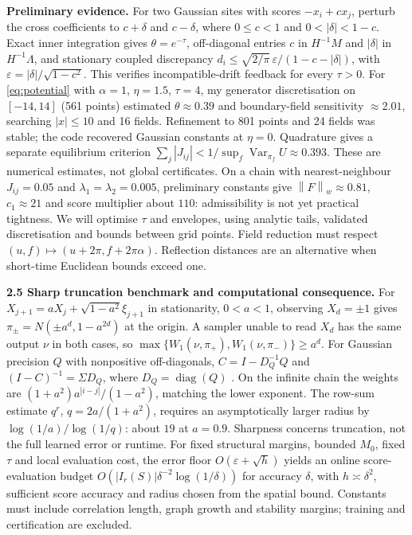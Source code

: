\documentclass[12pt,a4paper]{article}
\newcommand{\W}{W_1}
\newcommand{\normw}[1]{\left\|#1\right\|_w}
\begin{document}
\textbf{Preliminary evidence.} For two Gaussian sites with scores $-x_i+cx_j$, perturb the cross coefficients to $c+\delta$ and $c-\delta$, where $0\leq c<1$ and $0<|\delta|<1-c$. Exact inner integration gives $\theta=e^{-\tau}$, off-diagonal entries $c$ in $H^{-1}M$ and $|\delta|$ in $H^{-1}\Lambda$, and stationary coupled discrepancy $d_i\leq\sqrt{2/\pi}\,\varepsilon/(1-c-|\delta|)$, with $\varepsilon=|\delta|/\sqrt{1-c^2}$. This verifies incompatible-drift feedback for every $\tau>0$.
For \eqref{eq:potential} with $\alpha=1$, $\eta=1.5$, $\tau=4$, my generator discretisation on $[-14,14]$ (561 points) estimated $\theta\approx0.39$ and boundary-field sensitivity $\approx2.01$, searching $|x|\leq10$ and 16 fields. Refinement to 801 points and 24 fields was stable; the code recovered Gaussian constants at $\eta=0$. Quadrature gives a separate equilibrium criterion $\sum_j|J_{ij}|<1/\sup_f\operatorname{Var}_{\pi_f}U\approx0.393$. These are numerical estimates, not global certificates.
On a chain with nearest-neighbour $J_{ij}=0.05$ and $\lambda_1=\lambda_2=0.005$, preliminary constants give $\normw{F}\approx0.81$, $c_1\approx21$ and score multiplier about $110$: admissibility is not yet practical tightness. We will optimise $\tau$ and envelopes, using analytic tails, validated discretisation and bounds between grid points. Field reduction must respect $(u,f)\mapsto(u+2\pi,f+2\pi\alpha)$. Reflection distances are an alternative when short-time Euclidean bounds exceed one.

\textbf{2.5 Sharp truncation benchmark and computational consequence.}
For $X_{j+1}=aX_j+\sqrt{1-a^2}\xi_{j+1}$ in stationarity, $0<a<1$, observing $X_d=\pm1$ gives $\pi_\pm=N(\pm a^d,1-a^{2d})$ at the origin. A sampler unable to read $X_d$ has the same output $\nu$ in both cases, so $\max\{\W(\nu,\pi_+),\W(\nu,\pi_-)\}\geq a^d$. For Gaussian precision $Q$ with nonpositive off-diagonals, $C=I-D_Q^{-1}Q$ and $(I-C)^{-1}=\Sigma D_Q$, where $D_Q=\operatorname{diag}(Q)$ \cite{MJW06}. On the infinite chain the weights are $(1+a^2)a^{|i-j|}/(1-a^2)$, matching the lower exponent. The row-sum estimate $q^r$, $q=2a/(1+a^2)$, requires an asymptotically larger radius by $\log(1/a)/\log(1/q)$: about $19$ at $a=0.9$. Sharpness concerns truncation, not the full learned error or runtime.
For fixed structural margins, bounded $M_0$, fixed $\tau$ and local evaluation cost, the error floor $O(\varepsilon+\sqrt h)$ yields an online score-evaluation budget $O(|I_r(S)|\delta^{-2}\log(1/\delta))$ for accuracy $\delta$, with $h\asymp\delta^2$, sufficient score accuracy and radius chosen from the spatial bound. Constants must include correlation length, graph growth and stability margins; training and certification are excluded.
\end{document}
